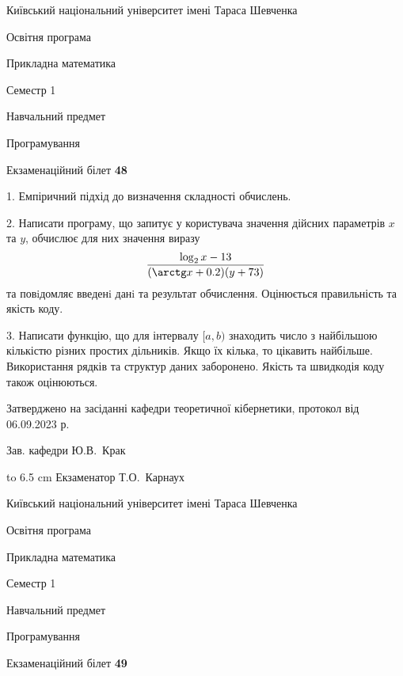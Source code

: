 \documentclass[12pt, ukrainian]{article}
\begin{document}
\vspace{0.9cm}
{{\begin {scriptsize}\par
{ \center  Київський національний університет імені Тараса Шевченка \par}
{\parbox {5 cm}{Освітня програма \hfill}{\parbox {7 cm}{Прикладна математика\hfill}}\parbox {6 cm}{\hfill Семестр 1}}\par
{\parbox {5 cm} {Навчальний предмет \hfill}\parbox {7 cm}{Програмування \hfill}\parbox {6cm}{\hfill}\par}\vspace{-15pt} \end{scriptsize}}{\center Екзаменаційний білет \No \textbf { 48 }\par}}
{%
1. Емпіричний підхід до визначення складності обчислень.%
\par
2. Написати програму, що запитує у користувача значення дійсних параметрів $x$ та $y$, обчислює для них значення виразу 
$$\frac{\log_{2} x - 13}{(\arctg x + 0.2) (y + 73)}$$ 
та повiдомляє введенi данi та результат обчислення.
 Оцінюється правильність та якість коду.

\par
3. Написати функцію, що для інтервалу $[a, b)$ знаходить число з найбільшою кількістю різних простих дільників. Якщо їх кілька, то цікавить найбільше.  Використання рядків та структур даних заборонено. Якість та швидкодія коду також оцінюються. 

}
{\smallskip\smallskip \begin {scriptsize} Затверджено на засіданні кафедри теоретичної кібернетики, протокол   від   06.09.2023 р.\par\smallskip\smallskip\smallskip\smallskip
{\parbox {6.5 cm} {Зав. кафедри \dotfill Ю.В.~Крак}}\hspace {0.7cm} {\hbox to 6.5 cm { Екзаменатор \dotfill Т.О.~Карнаух}} \end{scriptsize}}
\newpage
{{\begin {scriptsize}\par
{ \center  Київський національний університет імені Тараса Шевченка \par}
{\parbox {5 cm}{Освітня програма \hfill}{\parbox {7 cm}{Прикладна математика\hfill}}\parbox {6 cm}{\hfill Семестр 1}}\par
{\parbox {5 cm} {Навчальний предмет \hfill}\parbox {7 cm}{Програмування \hfill}\parbox {6cm}{\hfill}\par}\vspace{-15pt} \end{scriptsize}}{\center Екзаменаційний білет \No \textbf { 49 }\par}}
\end{document}
